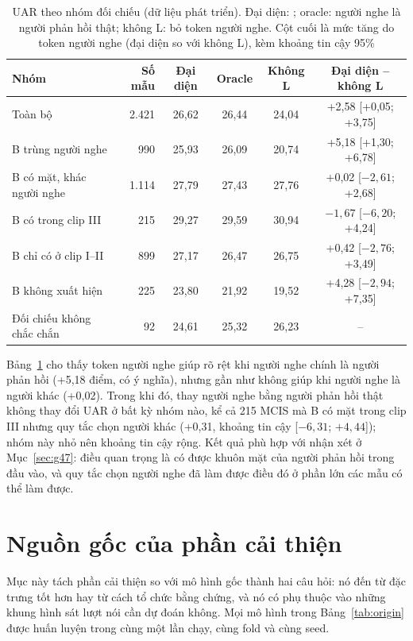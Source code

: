 \begin{table}[!htb]
\centering
\caption{UAR theo nhóm đối chiếu (dữ liệu phát triển). Đại diện: \model{}; oracle: người nghe là người phản hồi thật; không L: bỏ token người nghe. Cột cuối là mức tăng do token người nghe (đại diện so với không L), kèm khoảng tin cậy 95\%}
\label{tab:g48}
{\fontsize{12}{14}\selectfont
\begin{tabular}{lrcccc}
\toprule
Nhóm & Số mẫu & Đại diện & Oracle & Không L & Đại diện -- không L \\
\midrule
Toàn bộ & 2.421 & 26,62 & 26,44 & 24,04 & +2,58 [+0,05; +3,75] \\
B trùng người nghe & 990 & 25,93 & 26,09 & 20,74 & +5,18 [+1,30; +6,78] \\
B có mặt, khác người nghe & 1.114 & 27,79 & 27,43 & 27,76 & +0,02 [$-2{,}61$; +2,68] \\
\quad B có trong clip III & 215 & 29,27 & 29,59 & 30,94 & $-1{,}67$ [$-6{,}20$; +4,24] \\
\quad B chỉ có ở clip I--II & 899 & 27,17 & 26,47 & 26,75 & +0,42 [$-2{,}76$; +3,49] \\
B không xuất hiện & 225 & 23,80 & 21,92 & 19,52 & +4,28 [$-2{,}94$; +7,35] \\
Đối chiếu không chắc chắn & 92 & 24,61 & 25,32 & 26,23 & -- \\
\bottomrule
\end{tabular}}
\end{table}

Bảng~\ref{tab:g48} cho thấy token người nghe giúp rõ rệt khi người nghe chính là người phản hồi (+5,18 điểm, có ý nghĩa), nhưng gần như không giúp khi người nghe là người khác (+0,02). Trong khi đó, thay người nghe bằng người phản hồi thật không thay đổi UAR ở bất kỳ nhóm nào, kể cả 215 MCIS mà B có mặt trong clip III nhưng quy tắc chọn người khác (+0,31, khoảng tin cậy [$-6{,}31$; $+4{,}44$]); nhóm này nhỏ nên khoảng tin cậy rộng. Kết quả phù hợp với nhận xét ở Mục~\ref{sec:g47}: điều quan trọng là có được khuôn mặt của người phản hồi trong đầu vào, và quy tắc chọn người nghe đã làm được điều đó ở phần lớn các mẫu có thể làm được.


\section{Nguồn gốc của phần cải thiện}

Mục này tách phần cải thiện so với mô hình gốc thành hai câu hỏi: nó đến từ đặc trưng tốt hơn hay từ cách tổ chức bằng chứng, và nó có phụ thuộc vào những khung hình sát lượt nói cần dự đoán không. Mọi mô hình trong Bảng~\ref{tab:origin} được huấn luyện trong cùng một lần chạy, cùng fold và cùng seed.

